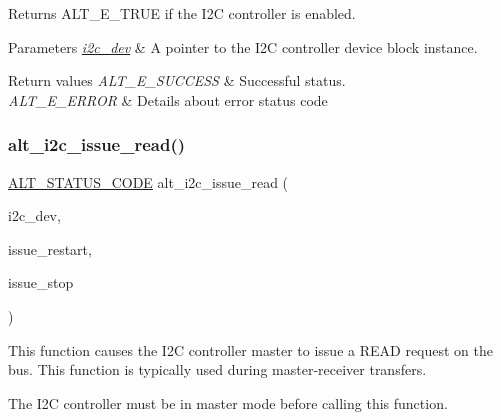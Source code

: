 Returns A\+L\+T\+\_\+\+E\+\_\+\+T\+R\+UE if the I2C controller is enabled.


\begin{DoxyParams}{Parameters}
{\em \mbox{\hyperlink{structi2c__dev}{i2c\+\_\+dev}}} & A pointer to the I2C controller device block instance.\\
\hline
\end{DoxyParams}

\begin{DoxyRetVals}{Return values}
{\em A\+L\+T\+\_\+\+E\+\_\+\+S\+U\+C\+C\+E\+SS} & Successful status. \\
\hline
{\em A\+L\+T\+\_\+\+E\+\_\+\+E\+R\+R\+OR} & Details about error status code \\
\hline
\end{DoxyRetVals}
\mbox{\label{group__ALT__I2C_gad3dbad0b53d35273f476b2c9c6284fae}} 
\subsubsection{\texorpdfstring{alt\_i2c\_issue\_read()}{alt\_i2c\_issue\_read()}}
{\footnotesize\ttfamily \mbox{\hyperlink{hwlib_8h_abdb0d369f069723ca55d6c94bcaaaa12}{A\+L\+T\+\_\+\+S\+T\+A\+T\+U\+S\+\_\+\+C\+O\+DE}} alt\+\_\+i2c\+\_\+issue\+\_\+read (\begin{DoxyParamCaption}\item[{\mbox{\hyperlink{structALT__I2C__DEV__s}{A\+L\+T\+\_\+\+I2\+C\+\_\+\+D\+E\+V\+\_\+t}} $\ast$}]{i2c\+\_\+dev,  }\item[{const bool}]{issue\+\_\+restart,  }\item[{const bool}]{issue\+\_\+stop }\end{DoxyParamCaption})}

This function causes the I2C controller master to issue a R\+E\+AD request on the bus. This function is typically used during master-\/receiver transfers.

The I2C controller must be in master mode before calling this function.


